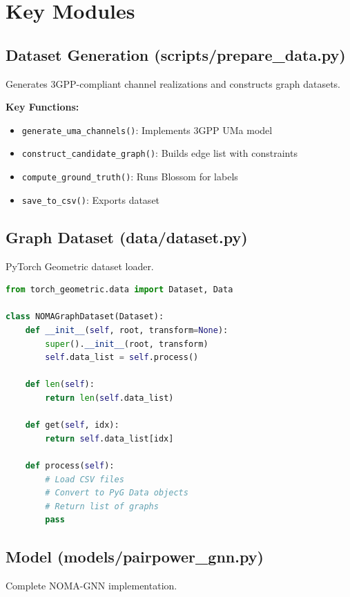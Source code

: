 \section{Key Modules}

\subsection{Dataset Generation (scripts/prepare_data.py)}

Generates 3GPP-compliant channel realizations and constructs graph datasets.

\textbf{Key Functions:}
\begin{itemize}
    \item \texttt{generate_uma_channels()}: Implements 3GPP UMa model
    \item \texttt{construct_candidate_graph()}: Builds edge list with constraints
    \item \texttt{compute_ground_truth()}: Runs Blossom for labels
    \item \texttt{save_to_csv()}: Exports dataset
\end{itemize}

\subsection{Graph Dataset (data/dataset.py)}

PyTorch Geometric dataset loader.

\begin{lstlisting}[language=Python, caption={Dataset Class}]
from torch_geometric.data import Dataset, Data

class NOMAGraphDataset(Dataset):
    def __init__(self, root, transform=None):
        super().__init__(root, transform)
        self.data_list = self.process()
    
    def len(self):
        return len(self.data_list)
    
    def get(self, idx):
        return self.data_list[idx]
    
    def process(self):
        # Load CSV files
        # Convert to PyG Data objects
        # Return list of graphs
        pass
\end{lstlisting}

\subsection{Model (models/pairpower_gnn.py)}

Complete NOMA-GNN implementation.

